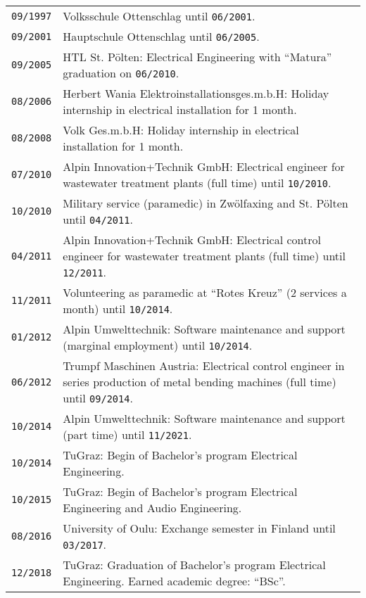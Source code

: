 \vspace*{0.75cm}
\\\\
\begin{tabularx}{\columnwidth}{>{\centering\arraybackslash}p{1.5cm} | p{12cm}}
  \texttt{09/1997} & Volksschule Ottenschlag until \texttt{06/2001}.\\
  \texttt{09/2001} & Hauptschule Ottenschlag until \texttt{06/2005}.\\
  \texttt{09/2005} & HTL St. Pölten: Electrical Engineering with \enquote{Matura} graduation on \texttt{06/2010}.\\
  \texttt{08/2006} & Herbert Wania Elektroinstallationsges.m.b.H: Holiday internship in electrical installation for 1 month.\\
  \texttt{08/2008} & Volk Ges.m.b.H: Holiday internship in electrical installation for 1 month.\\
  \texttt{07/2010} & Alpin Innovation+Technik GmbH: Electrical engineer for wastewater treatment plants (full time) until \texttt{10/2010}.\\
  \texttt{10/2010} & Military service (paramedic) in Zwölfaxing and St. Pölten until \texttt{04/2011}.\\
  \texttt{04/2011} & Alpin Innovation+Technik GmbH: Electrical control engineer for wastewater treatment plants (full time) until \texttt{12/2011}.\\
  \texttt{11/2011} & Volunteering as paramedic at \enquote{Rotes Kreuz} (2 services a month) until \texttt{10/2014}.\\
  \texttt{01/2012} & Alpin Umwelttechnik: Software maintenance and support (marginal employment) until \texttt{10/2014}.\\
  \texttt{06/2012} & Trumpf Maschinen Austria: Electrical control engineer in series production of metal bending machines (full time) until \texttt{09/2014}.\\
  \texttt{10/2014} & Alpin Umwelttechnik: Software maintenance and support (part time) until \texttt{11/2021}.\\
  \texttt{10/2014} & TuGraz: Begin of Bachelor's program Electrical Engineering.\\
  \texttt{10/2015} & TuGraz: Begin of Bachelor's program Electrical Engineering and Audio Engineering.\\
  \texttt{08/2016} & University of Oulu: Exchange semester in Finland until \texttt{03/2017}.\\
  \texttt{12/2018} & TuGraz: Graduation of Bachelor's program Electrical Engineering. Earned academic degree: \enquote{BSc}.\\

\end{tabularx}
